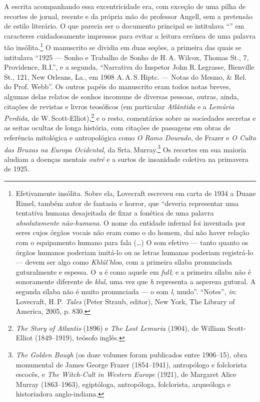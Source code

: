 A escrita acompanhando essa excentricidade era, com exceção de uma pilha
de recortes de jornal, recente e da própria mão do professor Angell, sem
a pretensão de estilo literário. O que parecia ser o documento principal
se intitulava ``'' em caracteres cuidadosamente
impressos para evitar a leitura errônea de uma palavra tão
insólita.\footnote{Efetivamente insólita. Sobre ela, Lovecraft escreveu
  em carta de 1934 a Duane Rimel, também autor de fantasia e horror, que
  ``deveria representar uma tentativa humana desajeitada de fixar a
  fonética de uma palavra \emph{absolutamente não-humana}. O nome da
  entidade infernal foi inventada por seres cujos órgãos vocais não eram
  como o do homem, daí não haver relação com o equipamento humano para
  fala (\ldots{}) O som efetivo --- tanto quanto os órgãos humanos poderiam
  imitá-lo ou as letras humanas poderiam registrá-lo --- devem ser algo
  como \emph{Khlûl'hloo}, com a primeira sílaba pronunciada guturalmente
  e espessa. O \emph{u} é como aquele em \emph{full}; e a primeira
  sílaba não é sonoramente diferente de \emph{klul}, uma vez que
  \emph{h} representa a aspereza gutural. A segunda sílaba não é muito
  pronunciada --- o som \emph{l}, mudo''. ``Notes'', \emph{in}:
  Lovecraft, H.\,P. \emph{Tales} (Peter Straub, editor), New York, The
  Library of America, 2005, p. 830.} O manuscrito se dividia em duas
seções, a primeira das quais se intitulava ``1925 --- Sonho e Trabalho
de Sonho de H.\,A. Wilcox, Thomas St., 7, Providence, R.I.'', e a
segunda, ``Narrativa do Inspetor John R.\,Legrasse, Bienville St., 121,
New Orleans, La., em 1908 A.\,A.\,S.\,Hiptc. --- Notas do Mesmo, \& Rel. do
Prof. Webb''. Os outros papéis do manuscrito eram todos notas breves,
algumas delas relatos de sonhos incomuns de diversas pessoas, outras,
ainda, citações de revistas e livros teosóficos (em particular
\emph{Atlântida} e a \emph{Lemúria Perdida}, de W.\,Scott-Elliot),\footnote{\emph{The
  Story of Atlantis} (1896) e \emph{The Lost Lemuria} (1904), de William
  Scott-Elliot (1849--1919), teósofo inglês.} e o resto, comentários
sobre as sociedades secretas e as seitas ocultas de longa história, com
citações de passagens em obras de referência mitológica e antropológica
como \emph{O Ramo Dourado,} de Frazer e \emph{O Culto das Bruxas na
Europa Ocidental}, da Srta.\,Murray.\footnote{\emph{The Golden Bough} (os
  doze volumes foram publicados entre 1906--15), obra monumental de James
  George Frazer (1854--1941), antropólogo e folclorista escocês, e
  \emph{The Witch-Cult in Western Europe} (1921), de Margaret Alice
  Murray (1863--1963), egiptóloga, antropóloga, folclorista, arqueóloga e
  historiadora anglo-indiana.} Os recortes em sua maioria aludiam a
doenças mentais \emph{outré} e a surtos de insanidade coletiva na
primavera de 1925.

